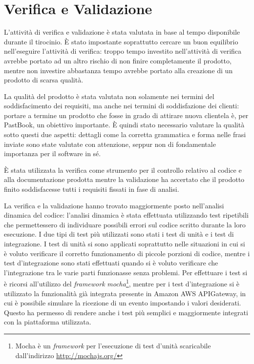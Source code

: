 
\chapter{Verifica e Validazione}

L'attività di verifica e validazione è stata valutata in base al tempo
disponibile durante il tirocinio. È stato impostante soprattutto cercare un
buon equilibrio nell'eseguire l'attività di verifica: troppo tempo investito
nell'attività di verifica avrebbe portato ad un altro rischio di non finire
completamente il prodotto, mentre non investire abbastanza tempo avrebbe
portato alla creazione di un prodotto di scarsa qualità.

La qualità del prodotto è stata valutata non solamente nei termini del
soddisfacimento dei requisiti, ma anche nei termini di soddisfazione dei
clienti: portare a termine un prodotto che fosse in grado di attirare nuova
clientela è, per PastBook, un obiettivo importante. È quindi stato necessario
valutare la qualità sotto questi due aspetti: dettagli come la corretta
grammatica e forma  nelle frasi inviate sono state valutate con attenzione,
seppur non di fondamentale importanza per il software in sé.

È stata utilizzata la verifica come strumento per il controllo relativo
al codice e alla documentazione prodotta mentre la validazione ha accertato
che il prodotto finito soddisfacesse tutti i requisiti fissati in fase di
analisi.

La verifica e la validazione hanno trovato maggiormente posto nell'analisi
dinamica del codice: l'analisi dinamica è stata effettuata utilizzando test
ripetibili che permettessero di individuare possibili errori sul codice
scritto durante la loro esecuzione.
I due tipi di test più utilizzati sono stati i test di unità e i test di
integrazione.
I test di unità si sono applicati soprattutto nelle situazioni in cui si è
voluto verificare il corretto funzionamento di piccole porzioni di codice,
mentre i test d'integrazione sono stati effettuati quando si è voluto
verificare che l'integrazione tra le varie parti funzionasse senza problemi.
Per effettuare i test si è ricorsi all'utilizzo del \textit{framework}
\textit{mocha}\footnote{Mocha è un \textit{framework} per l'esecuzione di test
d'unità scaricabile dall'indirizzo \url{http://mochajs.org/}}, mentre per i
test d'integrazione si è utilizzato la funzionalità già integrata presente in
Amazon AWS APIGateway, in cui è possibile simulare la ricezione di un evento
impostando i valori desiderati. Questo ha permesso di rendere anche i test più
semplici e maggiormente integrati con la piattaforma utilizzata.
